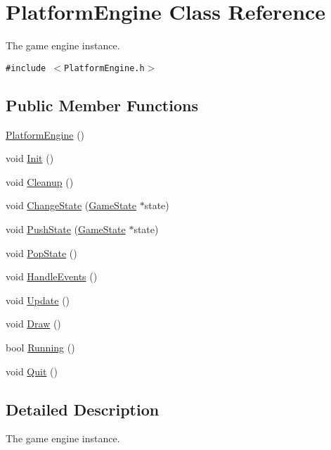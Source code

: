 \hypertarget{class_platform_engine}{
\section{PlatformEngine Class Reference}
\label{class_platform_engine}
}
The game engine instance.  


{\tt \#include $<$PlatformEngine.h$>$}

\subsection*{Public Member Functions}
\begin{CompactItemize}
\item 
\hyperlink{class_platform_engine_9d45e2da5a9b7e52d8c5636f70068e11}{PlatformEngine} ()
\item 
void \hyperlink{class_platform_engine_059814bb3f1815b15d5a892f8ea6cb4a}{Init} ()
\item 
void \hyperlink{class_platform_engine_361b54312d9ec2fa842cd982f67100f9}{Cleanup} ()
\item 
void \hyperlink{class_platform_engine_d2b335545c9ab6bce7be7c014bc8c528}{ChangeState} (\hyperlink{class_game_state}{GameState} $\ast$state)
\item 
void \hyperlink{class_platform_engine_98e3d34b6ee831bcc1d26bac83bfe8d8}{PushState} (\hyperlink{class_game_state}{GameState} $\ast$state)
\item 
void \hyperlink{class_platform_engine_cf001abec596906465197d1220db2230}{PopState} ()
\item 
void \hyperlink{class_platform_engine_7fc47bff353292f1a1435d78664df36d}{HandleEvents} ()
\item 
void \hyperlink{class_platform_engine_d3ab75304226ad3fcac6b66ce3cedbc7}{Update} ()
\item 
void \hyperlink{class_platform_engine_cd756d58f81c5e28efe98ae075367a5c}{Draw} ()
\item 
bool \hyperlink{class_platform_engine_31ec37c0222f4694cc3c0e819e143038}{Running} ()
\item 
void \hyperlink{class_platform_engine_dbcdd91813cabbe51bb2f86eb23e772a}{Quit} ()
\end{CompactItemize}


\subsection{Detailed Description}
The game engine instance. 

